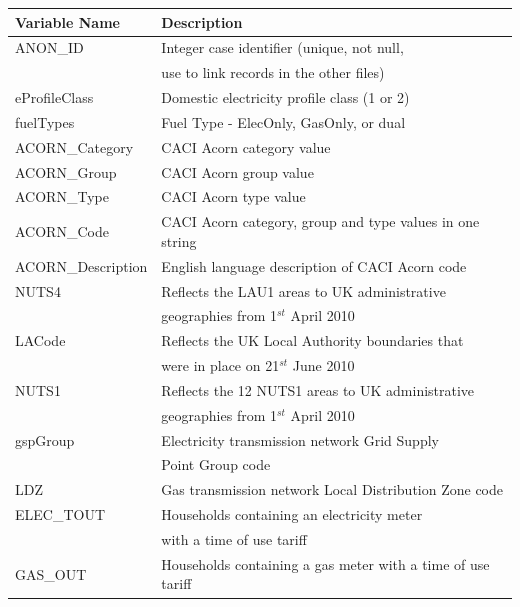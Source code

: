         \begin{center}
            \begin{tabular}{|l |l|}
            \hline
             \textbf{Variable Name} & \textbf{Description} \\
             \hline\hline
             ANON\_ID & Integer case identifier (unique, not null, \\& use to link records in the other files) \\ 
             \hline
             eProfileClass & Domestic electricity profile class (1 or 2) \\
             \hline
             fuelTypes & Fuel Type - ElecOnly, GasOnly, or dual \\
             \hline
             ACORN\_Category & CACI Acorn category value \\
             \hline
             ACORN\_Group & CACI Acorn group value \\
             \hline
             ACORN\_Type & CACI Acorn type value \\
             \hline
             ACORN\_Code & CACI Acorn category, group and type values in one string \\
             \hline
             ACORN\_Description & English language description of CACI Acorn code \\
             \hline
             NUTS4 & Reflects the LAU1 areas to UK administrative \\&  geographies from 1$^{st}$ April 2010 \\
             \hline
             LACode & Reflects the UK Local Authority  boundaries that \\&  were in place on 21$^{st}$ June 2010\\
             \hline
             NUTS1 & Reflects the 12 NUTS1 areas to UK administrative \\& geographies from 1$^{st}$ April 2010\\
             \hline
             gspGroup & Electricity transmission network Grid Supply \\& Point Group code\\
             \hline
             LDZ & Gas transmission network Local Distribution Zone code\\
             \hline
             ELEC\_TOUT & Households containing an electricity meter \\& with a time of use tariff\\
             \hline
             GAS\_OUT & Households containing a gas meter with a time of use tariff\\
             \hline
            \end{tabular}
        \end{center}
        
